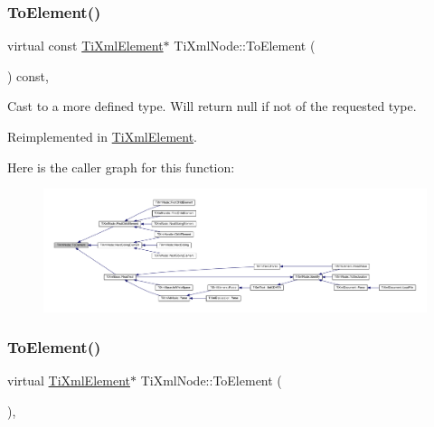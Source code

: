 \mbox{\label{class_ti_xml_node_a4080428f2cac46e92ef4d284202fad0b}} 
\subsubsection{\texorpdfstring{To\+Element()}{ToElement()}\hspace{0.1cm}{\footnotesize\ttfamily [1/2]}}
{\footnotesize\ttfamily virtual const \hyperlink{class_ti_xml_element}{Ti\+Xml\+Element}$\ast$ Ti\+Xml\+Node\+::\+To\+Element (\begin{DoxyParamCaption}{ }\end{DoxyParamCaption}) const\hspace{0.3cm}{\ttfamily [inline]}, {\ttfamily [virtual]}}



Cast to a more defined type. Will return null if not of the requested type. 



Reimplemented in \hyperlink{class_ti_xml_element_a940fc8aa953e0ef0de6e110b7d98b8ee}{Ti\+Xml\+Element}.

Here is the caller graph for this function\+:
\nopagebreak
\begin{figure}[H]
\begin{center}
\leavevmode
\includegraphics[width=350pt]{class_ti_xml_node_a4080428f2cac46e92ef4d284202fad0b_icgraph}
\end{center}
\end{figure}
\mbox{\label{class_ti_xml_node_aa65d000223187d22a4dcebd7479e9ebc}} 
\subsubsection{\texorpdfstring{To\+Element()}{ToElement()}\hspace{0.1cm}{\footnotesize\ttfamily [2/2]}}
{\footnotesize\ttfamily virtual \hyperlink{class_ti_xml_element}{Ti\+Xml\+Element}$\ast$ Ti\+Xml\+Node\+::\+To\+Element (\begin{DoxyParamCaption}{ }\end{DoxyParamCaption})\hspace{0.3cm}{\ttfamily [inline]}, {\ttfamily [virtual]}}



